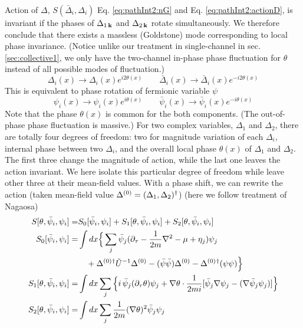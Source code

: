  Action of $\Delta$, $S(\bar{\Delta}_i,\Delta_i)$ Eq. \eqref{eq:pathInt2:nG} and Eq. \eqref{eq:pathInt2:actionD}, is invariant if the phases of $\Delta_{1\,\mathbf{k}}$ and $\Delta_{2\,\mathbf{k}}$ rotate simultaneously. We therefore conclude that there exists a massless (Goldstone) mode corresponding to local phase invariance. (Notice unlike our treatment in single-channel in sec. \ref{sec:collective1}, we only have the two-channel in-phase phase fluctuation for $\theta$ instead of all possible modes of fluctuation.)
\begin{equation*}
\Delta_{i}(x)\rightarrow{}\Delta_{i}(x)e^{i2\theta(x)}\qquad{}
\bar{\Delta}_{i}(x)\rightarrow{}\bar{\Delta}_{i}(x)e^{-i2\theta(x)}
\end{equation*}
This is equivalent to  phase  rotation of fermionic variable $\psi$
\begin{equation*}
\psi_{i}(x)\rightarrow{}\psi_{i}(x)e^{i\theta(x)}\qquad{}
\bar{\psi}_{i}(x)\rightarrow{}\bar{\psi}_{i}(x)e^{-i\theta(x)}
\end{equation*}
Note that the phase $\theta(x)$ is common for the both components. (The out-of-phase phase fluctuation is massive.) For two complex variables, $\Delta_1$ and $\Delta_2$, there are totally four degrees of freedom: two for magnitude variation of each $\Delta_i$,  internal phase between two $\Delta_i$, and the overall local phase $\theta(x)$ of $\Delta_1$ and $\Delta_2$.  The first three change the magnitude of action, while the last one leaves the action invariant.  We here isolate this particular degree of freedom while leave other three at their mean-field values. With a phase shift, we can rewrite the action (taken mean-field value $\Delta^{(0)}=(\Delta_1,\Delta_2)^{\dagger}$) (here we  follow treatment of Nagaosa\cite{Nagaosa})
\begin{subequations}\label{eq:pathInt2:actionPhase}
\begin{align}
S[\theta,\bar\psi_{i},\psi_{i}]=&S_0[\bar\psi_{i},\psi_{i}]+S_1[\theta,\bar\psi_{i},\psi_{i}]+S_2[\theta,\bar\psi_{i},\psi_{i}]\\
S_0[\bar\psi_{i},\psi_{i}]=&\int{dx}
\Big\{\sum_{j}\bar\psi_{j}(\partial_\tau-\frac{1}{2m}\nabla^{2}-\mu+\eta_{j})\psi_{j}\nonumber\\
&\quad+\Delta^{(0)}{}^{\dagger}\tilde{U}^{-1}\Delta^{(0)}-(\bar\psi\bar\psi)\Delta^{(0)}-{\Delta^{(0)}}{}^{\dagger}(\psi\psi)\Big\}\\
S_1[\theta,\bar\psi_{i},\psi_{i}]=&\int{dx}\sum_{j}\Big\{
   i\,\bar\psi_{j}(\partial_{\tau}\theta)\psi_{j}+\nabla\theta\cdot\frac{1}{2mi}[\bar\psi_{j}\nabla\psi_{j}-(\nabla\bar{\psi}_{j}\psi_{j})]\Big\}\\
S_2[\theta,\bar\psi_{i},\psi_{i}]=&\int{dx}\sum_{j}\frac{1}{2m}(\nabla\theta)^{2}\bar\psi_{j}\psi_{j}
\end{align}
\end{subequations}
